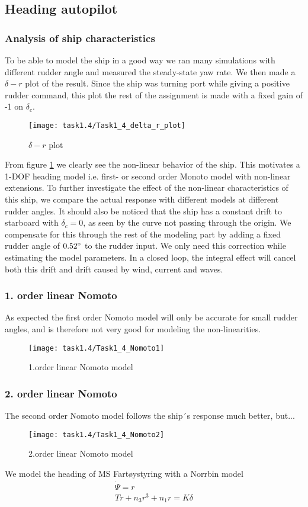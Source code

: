 \subsection{Heading autopilot}\label{sec:prob1.1}
\subsubsection*{Analysis of ship characteristics}
To be able to model the ship in a good way we ran many simulations with different rudder angle and measured the steady-state yaw rate. We then made a $\delta-r$ plot of the result. Since the ship was turning port while giving a positive rudder command, this plot the rest of the assignment is made with a fixed gain of -1 on $\delta_c$.

\begin{figure}[h]
    \centering
    \texttt{[image: task1.4/Task1\_4\_delta\_r\_plot]}
    \caption{$\delta - r$ plot}
    \label{fig:delta-r-plot}
\end{figure}

From figure \ref{fig:delta-r-plot} we clearly see the non-linear behavior of the ship. This motivates a 1-DOF heading model i.e. first- or second order Monoto model with non-linear extensions. To further investigate the effect of the non-linear characteristics of this ship, we compare the actual response with different models at different rudder angles. It should also be noticed that the ship has a constant drift to starboard with $\delta_c=0$, as seen by the curve not passing through the origin. We compensate for this through the rest of the modeling part by adding a fixed rudder angle of $0.52\degree$ to the rudder input. We only need this correction while estimating the model parameters. In a closed loop, the integral effect will cancel both this drift and drift caused by wind, current and waves.
\subsubsection*{1. order linear Nomoto}
As expected the first order Nomoto model will only be accurate for small rudder angles, and is therefore not very good for modeling the non-linearities. 
\begin{figure}[h]
    \centering
    \texttt{[image: task1.4/Task1\_4\_Nomoto1]}
    \caption{1.order linear Nomoto model}
    \label{fig:nomoto1}
\end{figure}

\subsubsection*{2. order linear Nomoto}
The second order Nomoto model follows the ship´s response much better, but...
\begin{figure}[h]
    \centering
    \texttt{[image: task1.4/Task1\_4\_Nomoto2]}
    \caption{2.order linear Nomoto model}
    \label{fig:nomoto2}
\end{figure}


We model the heading of MS Fartøystyring with a Norrbin model
\begin{equation}
\begin{split}
\dot{\Psi} = r \\
T\dot{r}+n_3r^3 + n_1r=K\delta
\end{split}
\end{equation}
